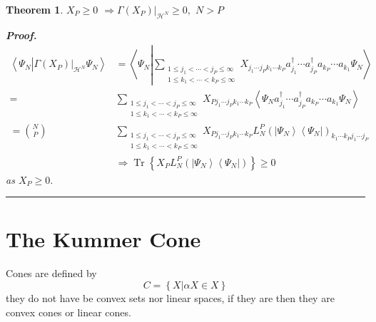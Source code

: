 \documentclass[aps,preprint]{revtex4}%
\newtheorem{theorem}{Theorem}
\newenvironment{proof}[1][Proof]{\noindent\textbf{#1.} }{\ \rule{0.5em}{0.5em}}
\begin{document}
\begin{theorem}
$X_{P}\geq0$ $\Rightarrow\left.  \Gamma\left(  X_{P}\right)  \right\vert
_{\mathcal{H}^{N}}\geq0,$ $N>P$

\begin{proof}%
\begin{align}
\left\langle \Psi_{N}\left\vert \left.  \Gamma\left(  X_{P}\right)
\right\vert _{\mathcal{H}^{N}}\right.  \Psi_{N}\right\rangle  &  =\left\langle
\Psi_{N}\left\vert \sum_{\substack{1\leq j_{1}<\cdots<j_{P}\leq\infty\\1\leq
k_{1}<\cdots<k_{P}\leq\infty}}X_{j_{1}\cdots j_{P}k_{1}\cdots k_{P}}a_{j_{1}%
}^{\dagger}\cdots a_{j_{P}}^{\dagger}a_{k_{P}}\cdots a_{k_{1}}\right.
\Psi_{N}\right\rangle \nonumber\\
=  &  \sum_{\substack{1\leq j_{1}<\cdots<j_{P}\leq\infty\\1\leq k_{1}%
<\cdots<k_{P}\leq\infty}}X_{Pj_{1}\cdots j_{P}k_{1}\cdots k_{P}}\left\langle
\Psi_{N}a_{j_{1}}^{\dagger}\cdots a_{j_{P}}^{\dagger}a_{k_{P}}\cdots a_{k_{1}%
}\Psi_{N}\right\rangle \nonumber\\
=\binom{N}{P}  &  \sum_{\substack{1\leq j_{1}<\cdots<j_{P}\leq\infty\\1\leq
k_{1}<\cdots<k_{P}\leq\infty}}X_{Pj_{1}\cdots j_{P}k_{1}\cdots k_{P}}L_{N}%
^{P}\left(  \left\vert \Psi_{N}\right\rangle \left\langle \Psi_{N}\right\vert
\right)  _{k_{1}\cdots k_{P}j_{1}\cdots j_{P}}\nonumber\\
&  \Rightarrow\operatorname{Tr}\left\{  X_{P}L_{N}^{P}\left(  \left\vert
\Psi_{N}\right\rangle \left\langle \Psi_{N}\right\vert \right)  \right\}
\geq0
\end{align}
as $X_{P}\geq0.$
\end{proof}
\end{theorem}

\section{The Kummer Cone}

Cones are defined by
\begin{equation}
C=\left\{  \left.  X\right\vert \alpha X\in X\right\}
\end{equation}
they do not have be convex sets nor linear spaces, if they are then they are
convex cones or linear cones.
\end{document}
